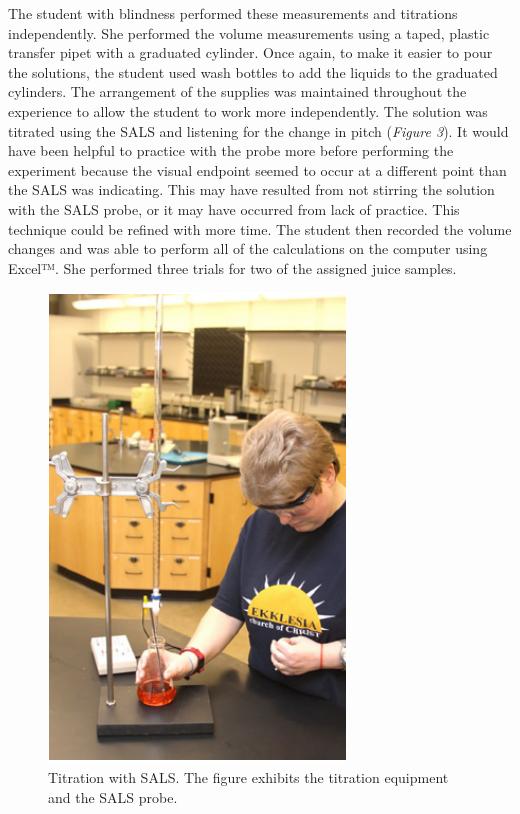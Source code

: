 \documentclass[11.5pt]{sig-alternate} %
\begin{document}
\begin{large}
The student with blindness performed these measurements and titrations independently. She performed the volume measurements using a taped, plastic transfer pipet with a graduated cylinder. Once again, to make it easier to pour the solutions, the student used wash bottles to add the liquids to the graduated cylinders. The arrangement of the supplies was maintained throughout the experience to allow the student to work more independently. The solution was titrated using the SALS and listening for the change in pitch (\textit{Figure 3}). It would have been helpful to practice with the probe more before performing the experiment because the visual endpoint seemed to occur at a different point than the SALS was indicating. This may have resulted from not stirring the solution with the SALS probe, or it may have occurred from lack of practice. This technique could be refined with more time. The student then recorded the volume changes and was able to perform all of the calculations on the computer using Excel™. She performed three trials for two of the assigned juice samples.

\begin{figure}[!htb]
    \centering
    \includegraphics[width=1\linewidth]{fig3.png}
    \caption{Titration with SALS. The figure exhibits the titration equipment and the SALS probe.}
\end{figure}


\end{large}
\end{document}
